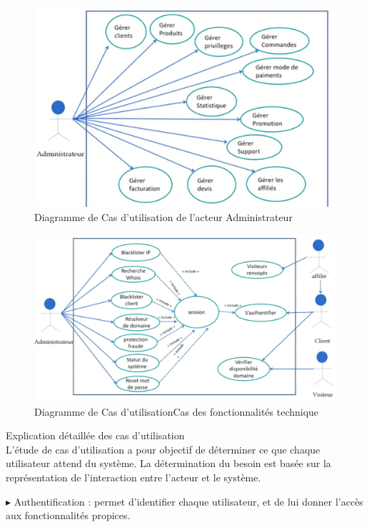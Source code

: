 \documentclass[a4paper, 12pt]{report}
\begin{document}
\begin{figure}[H]
	\centering
	\includegraphics{img/cas-admin}
	\caption{Diagramme de Cas d’utilisation de l’acteur Administrateur}
	\label{Tux}
\end{figure}
\begin{figure}[H]
	\centering
	\includegraphics{img/cas-technique}
	\caption{Diagramme de Cas d’utilisationCas des fonctionnalités technique}
	\label{Tux}
\end{figure}
                
\noindent Explication détaillée des cas d’utilisation
\\
\noindent
L’étude de cas d’utilisation a pour objectif de déterminer ce que chaque utilisateur attend du système. La détermination du besoin est basée sur la représentation de l’interaction entre l’acteur et le système.

\noindent $\blacktriangleright$ Authentification : permet d’identifier chaque utilisateur, et de lui donner l’accès aux fonctionnalités propices.
\end{document}
